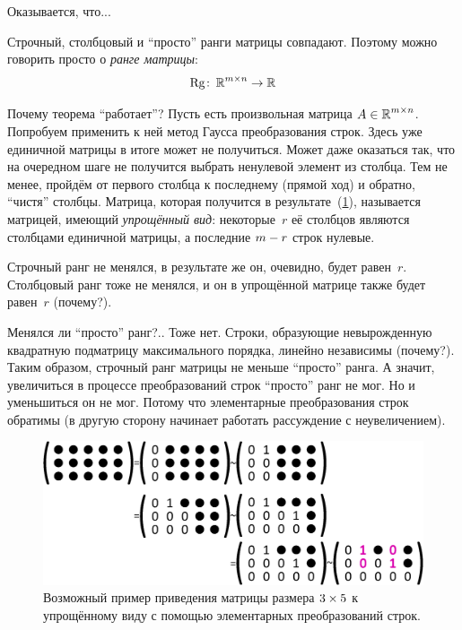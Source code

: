 \documentclass[a4paper,12pt]{article}
\begin{document}
    Оказывается, что...
    
    \begin{theorem}
      Строчный, столбцовый и ``просто'' ранги матрицы совпадают.
      Поэтому можно говорить просто о \emph{ранге матрицы}:
      \[
        \Rg\colon \RR^{m\times n} \hm\to \RR
      \]
    \end{theorem}
    
    Почему теорема ``работает''?
    Пусть есть произвольная матрица $A \hm\in \RR^{m \times n}$.
    Попробуем применить к ней метод Гаусса преобразования строк.
    Здесь уже единичной матрицы в итоге может не получиться.
    Может даже оказаться так, что на очередном шаге не получится выбрать ненулевой элемент из столбца.
    Тем не менее, пройдём от первого столбца к последнему (прямой ход) и обратно, ``чистя'' столбцы.
    Матрица, которая получится в результате~(\ref{fig:rang}), называется матрицей, имеющий \emph{упрощённый вид}: некоторые~$r$ её столбцов являются столбцами единичной матрицы, а последние $m \hm- r$ строк нулевые.
    
    Строчный ранг не менялся, в результате же он, очевидно, будет равен~$r$.
    Столбцовый ранг тоже не менялся, и он в упрощённой матрице также будет равен~$r$ (почему?).
    
    Менялся ли ``просто'' ранг?..
    Тоже нет.
    Строки, образующие невырожденную квадратную подматрицу максимального порядка, линейно независимы (почему?).
    Таким образом, строчный ранг матрицы не меньше ``просто'' ранга.
    А значит, увеличиться в процессе преобразований строк ``просто'' ранг не мог.
    Но и уменьшиться он не мог.
    Потому что элементарные преобразования строк обратимы (в другую сторону начинает работать рассуждение с неувеличением).
    
    \begin{figure}[h]
      \centering
    
      \includegraphics[width=0.8\columnwidth]{rang}
    
      \caption{Возможный пример приведения матрицы размера $3 \hm\times 5$ к упрощённому виду с помощью элементарных преобразований строк.}
      \label{fig:rang}
    \end{figure}
\end{document}
